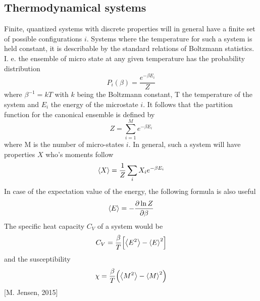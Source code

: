 \documentclass[%
reprint,nofootinbib,
amsmath,amssymb,
aps,
]{revtex4-1}
\begin{document}
\subsection{Thermodynamical systems} \noindent 
Finite, quantized systems with discrete properties will in general have a finite set of possible configurations $i$. Systems where the temperature for such a system is held constant, it is describable by the standard relations of Boltzmann statistics. I. e. the ensemble of micro state at any given temperature has the probability distribution \vspace{1mm}
\begin{equation}
P_i(\beta) = \dfrac{e^{-\beta E_i}}{Z}
\end{equation}  \vspace{1mm}
where $\beta^{-1} = kT$ with $k$ being the Boltzmann constant, T the temperature of the system and $E_i$ the energy of the microstate $i$. It follows that the partition function for the canonical ensemble is defined by\vspace{1mm}
\begin{equation}\label{pf}
	Z = \sum_{i = 1}^{M}e^{-\beta E_i}
\end{equation}\vspace{1mm}
where M is the number of micro-states $i$. In general, such a system will have properties $X$ who's moments follow \vspace{1mm}
\begin{equation}
	\expval{X} = \dfrac{1}{Z}\sum_iX_ie^{-\beta E_i}
\end{equation}\vspace{1mm}
In case of the expectation value of the energy, the following formula is also useful\vspace{1mm}
\begin{equation}\label{ev}
 \expval{E} = -\dfrac{\partial\ln Z}{\partial\beta}
\end{equation}\vspace{1mm}
The specific heat capacity $C_V$ of a system would be \vspace{1mm}
\begin{equation}\label{cv}
C_V = \dfrac{\beta}{T}\qty[\expval{E^2}-\expval{E}^2]
\end{equation}\vspace{1mm}
and the susceptibility \vspace{1mm}
\begin{equation}\label{chi}
\chi = \dfrac{\beta}{T}\qty(\expval{M^2}- \expval{M}^2) \vspace{1mm}
\end{equation} 
\hspace{6.cm}[M. Jensen, 2015]
\end{document}
